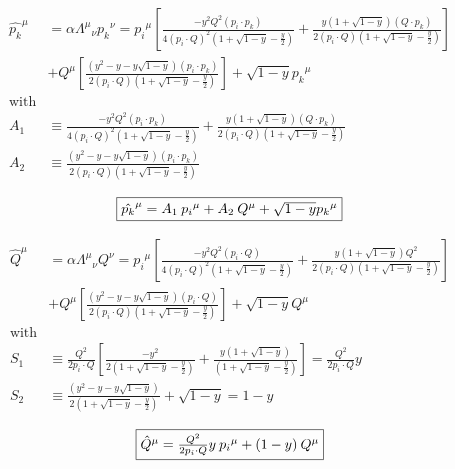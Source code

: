 \begin{equation}
	\begin{aligned}
	{\hat{{p_k}}}^{\mu}&=\alpha{\Lambda^{\mu}}_{\nu} {p_k}^{\nu}= {p_i}^{\mu}[  \frac{-y^2 Q^2 (p_{i}\cdot {p_k})}{4(p_i\cdot Q)^2(1+\sqrt{1-y}-\frac{y}{2})}+ \frac{y(1+\sqrt{1-y})(Q \cdot {p_k})}{2(p_i\cdot Q)(1+\sqrt{1-y}-\frac{y}{2})}]\\
	&+{Q}^{\mu} [ \frac{(y^2 -y-y\sqrt{1-y}) (p_{i}\cdot {p_k})}{2(p_i\cdot Q)(1+\sqrt{1-y}-\frac{y}{2})}]+\sqrt{1-y} {p_k}^{\mu}\\	
\text{with}\\
	A_1 &\equiv  \frac{-y^2 Q^2 (p_{i}\cdot {p_k})}{4(p_i\cdot Q)^2(1+\sqrt{1-y}-\frac{y}{2})}+ \frac{y(1+\sqrt{1-y})(Q \cdot {p_k})}{2(p_i\cdot Q)(1+\sqrt{1-y}-\frac{y}{2})}\\
		A_2 &\equiv   \frac{(y^2 -y-y\sqrt{1-y}) (p_{i}\cdot {p_k})}{2(p_i\cdot Q)(1+\sqrt{1-y}-\frac{y}{2})}\:\:\:\:\:\:\:\:\:\:\:\:\:\:\:\:\:\:\:\:\:\:\:\:\:\:\:\:\:\:\:\:\:\:\:\:\:\:\:\:\:\:\:\:\:\:\:\:\:\:\:\:\:\:\\\
    \end{aligned}    
\end{equation}
\begin{equation}
	\begin{aligned}
		\fbox{$  {\hat{{p_k}}}^{\mu}= A_1 \:{p_i}^{\mu}+A_2\:{Q}^{\mu}+\sqrt{1-y} {p_k}^{\mu} $}
    \end{aligned}
\end{equation}


\begin{equation}
	\begin{aligned}
	{\hat{{Q}}}^{\mu}&=\alpha{\Lambda^{\mu}}_{\nu} {Q}^{\nu}= {p_i}^{\mu}[  \frac{-y^2 Q^2 (p_{i}\cdot {Q})}{4(p_i\cdot Q)^2(1+\sqrt{1-y}-\frac{y}{2})}+ \frac{y(1+\sqrt{1-y})Q^2}{2(p_i\cdot Q)(1+\sqrt{1-y}-\frac{y}{2})}]\\
	&+{Q}^{\mu} [ \frac{(y^2 -y-y\sqrt{1-y}) (p_{i}\cdot {Q})}{2(p_i\cdot Q)(1+\sqrt{1-y}-\frac{y}{2})}]
	+\sqrt{1-y} {Q}^{\mu}\\
\text{with}\\
	S_1 &\equiv  \frac{Q^2}{2p_i \cdot Q}[\frac{-y^2}{2(1+\sqrt{1-y}-\frac{y}{2})}+ \frac{y(1+\sqrt{1-y})}{(1+\sqrt{1-y}-\frac{y}{2})}]=\frac{Q^2}{2p_i \cdot Q}y\\
		S_2 &\equiv   \frac{(y^2 -y-y\sqrt{1-y})}{2(1+\sqrt{1-y}-\frac{y}{2})}+\sqrt{1-y}=1-y\:\:\:\:\:\:\:\:\:\:\:\:\:\:\:\:\:\:\:\:\:\:\:\:\:\:\:\:\:\:\:\:\:\:\:\:\:\:\:\:\:\:\:\:\:\:\:\:\:\:\:\:\:\:\\\	
    \end{aligned}    
\end{equation}
\begin{equation}
	\begin{aligned}
		\fbox{$  {\hat{{Q}}}^{\mu}= \frac{Q^2}{2p_i \cdot Q}y \:{p_i}^{\mu}+(1-y)\:{Q}^{\mu} $}
    \end{aligned}
\end{equation}

